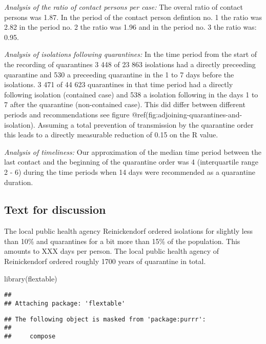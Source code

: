\documentclass[
]{article}
\newenvironment{Shaded}{\begin{snugshade}}{\end{snugshade}}
\newcommand{\FunctionTok}[1]{\textcolor[rgb]{0.00,0.00,0.00}{#1}}
\newcommand{\NormalTok}[1]{#1}
\begin{document}
\emph{Analysis of the ratio of contact persons per case:} The overal
ratio of contact persons was 1.87. In the period of the contact person
defintion no. 1 the ratio was 2.82 in the period no. 2 the ratio was
1.96 and in the period no. 3 the ratio was: 0.95.

\emph{Analysis of isolations following quarantines:} In the time period
from the start of the recording of quarantines 3 448 of 23 863
isolations had a directly preceeding quarantine and 530 a preceeding
quarantine in the 1 to 7 days before the isolations. 3 471 of 44 623
quarantines in that time period had a directly following isolation
(contained case) and 538 a isolation following in the days 1 to 7 after
the quarantine (non-contained case). This did differ between different
periods and recommendations see figure
@ref(fig:adjoining-quarantines-and-isolation). Assuming a total
prevention of transmission by the quarantine order this leads to a
directly measurable reduction of 0.15 on the R value.

\emph{Analysis of timeliness:} Our approximation of the median time
period between the last contact and the beginning of the quarantine
order was 4 (interquartile range 2 - 6) during the time periods when 14
days were recommended as a quarantine duration.

\hypertarget{text-for-discussion}{%
\subsection{Text for discussion}\label{text-for-discussion}}

The local public health agency Reinickendorf ordered isolations for
slightly less than 10\% and quarantines for a bit more than 15\% of the
population. This amounts to XXX days per person. The local public health
agency of Reinickendorf ordered roughly 1700 years of quarantine in
total.

\begin{Shaded}
\begin{Highlighting}[]
\FunctionTok{library}\NormalTok{(flextable)}
\end{Highlighting}
\end{Shaded}

\begin{verbatim}
## 
## Attaching package: 'flextable'
\end{verbatim}

\begin{verbatim}
## The following object is masked from 'package:purrr':
## 
##     compose
\end{verbatim}
\end{document}
